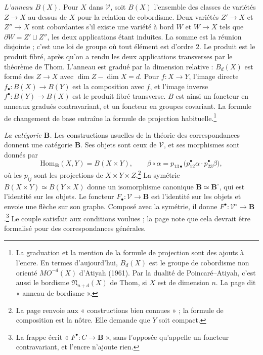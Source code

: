 \documentclass[11pt,a4paper]{article}
\begin{document}
\emph{L'anneau $B(X)$.} Pour $X$ dans $\mathcal{V}$, soit $B(X)$ l'ensemble des
classes de variétés $Z \to X$ au-dessus de $X$ pour la relation de cobordisme.
Deux variétés $Z' \to X$ et $Z'' \to X$ sont cobordantes s'il existe une
variété à bord $W$ et $W \to X$ tels que $\partial W = Z' \sqcup Z''$, les deux
applications étant induites. La somme est la réunion disjointe ; c'est une loi
de groupe où tout élément est d'ordre 2. Le produit est le produit fibré, après
qu'on a rendu les deux applications transverses par le théorème de Thom.
L'anneau est gradué par la dimension relative : $B_d(X)$ est formé des $Z \to
X$ avec $\dim Z - \dim X = d$. Pour $f : X \to Y$, l'image directe $f_\bullet :
B(X) \to B(Y)$ est la composition avec $f$, et l'image inverse $f^\bullet :
B(Y) \to B(X)$ est le produit fibré transverse. $B$ est ainsi un foncteur en
anneaux gradués contravariant, et un foncteur en groupes covariant. La formule
de changement de base entraîne la formule de projection
habituelle.\footnote{La graduation et la mention de la formule de projection
sont des ajouts à l'encre. En termes d'aujourd'hui, $B_d(X)$ est le groupe de
cobordisme non orienté $MO^{-d}(X)$ d'Atiyah (1961). Par la dualité de
Poincaré--Atiyah, c'est aussi le bordisme $\mathfrak{N}_{n+d}(X)$ de Thom, si
$X$ est de dimension $n$. La page dit « anneau de bordisme ».}

\emph{La catégorie $\mathbf{B}$.} Les constructions usuelles de la théorie des
correspondances donnent une catégorie $\mathbf{B}$. Ses objets sont ceux de
$\mathcal{V}$, et ses morphismes sont donnés par
\[
\mathrm{Hom}_{\mathbf{B}}(X, Y) = B(X \times Y),
\qquad
\beta \circ \alpha = p_{13\bullet}\big(p_{12}^{\bullet}\alpha \cdot p_{23}^{\bullet}\beta\big),
\]
où les $p_{ij}$ sont les projections de $X \times Y \times Z$.\footnote{La page
renvoie aux « constructions bien connues » ; la formule de composition est la
nôtre. Elle demande que $Y$ soit compact.} La symétrie $B(X \times Y) \simeq
B(Y \times X)$ donne un isomorphisme canonique $\mathbf{B} \simeq
\mathbf{B}^{\circ}$, qui est l'identité sur les objets. Le foncteur $F_\bullet :
\mathcal{V} \to \mathbf{B}$ est l'identité sur les objets et envoie une flèche
sur son graphe. Composé avec la symétrie, il donne $F^\bullet :
\mathcal{V}^{\circ} \to \mathbf{B}$.\footnote{La frappe écrit « $F^\bullet : C
\to \mathbf{B}$ », sans l'opposée qu'appelle un foncteur contravariant, et
l'encre n'ajoute rien.} Le couple satisfait aux conditions voulues ; la page
note que cela devrait être formalisé pour des correspondances générales.
\end{document}
